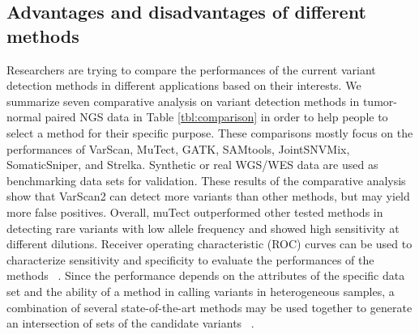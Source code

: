 \documentclass[11pt,reqno]{amsart}
\begin{document}
\subsection{Advantages and disadvantages of different methods}
Researchers are trying to compare the performances of the current variant detection methods in different applications based on their interests.
We summarize seven comparative analysis on variant detection methods in tumor-normal paired NGS data in Table \ref{tbl:comparison} in order to help people to select a method for their specific purpose.
These comparisons mostly focus on the performances of VarScan, MuTect, GATK, SAMtools, JointSNVMix, SomaticSniper, and Strelka.
Synthetic or real WGS/WES data are used as benchmarking data sets for validation.
These results of the comparative analysis show that VarScan2 can detect more variants than other methods, but may yield more false positives.
Overall, muTect outperformed other tested methods in detecting rare variants with low allele frequency and showed high sensitivity at different dilutions.
Receiver operating characteristic (ROC) curves can be used to characterize sensitivity and specificity to evaluate the performances of the methods ~\citep{Xu2014, Huang2015}.
Since the performance depends on the attributes of the specific data set and the ability of a method in calling variants in heterogeneous samples, a combination of several state-of-the-art methods may be used together to generate an intersection of sets of the candidate variants ~\citep{liu2013variant}.
\end{document}
